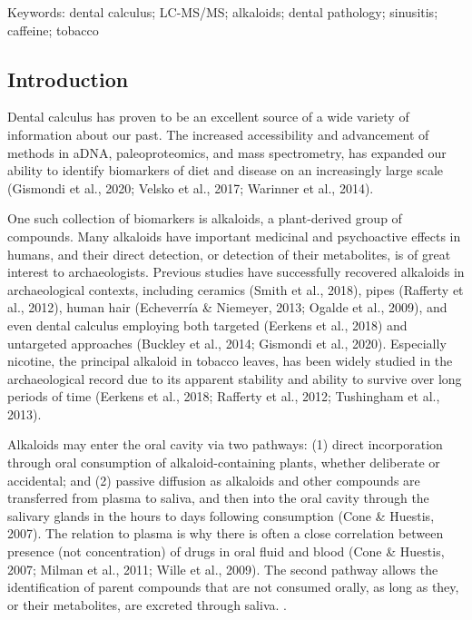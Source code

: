 \documentclass[
]{article}
\begin{document}
Keywords:  dental calculus; LC-MS/MS; alkaloids; dental pathology;
sinusitis; caffeine; tobacco 
\ifdefined\Shaded\renewenvironment{Shaded}{\begin{tcolorbox}[boxrule=0pt, borderline west={3pt}{0pt}{shadecolor}, sharp corners, frame hidden, enhanced, interior hidden, breakable]}{\end{tcolorbox}}\fi

\hypertarget{introduction}{%
\subsection{Introduction}\label{introduction}}

Dental calculus has proven to be an excellent source of a wide variety
of information about our past. The increased accessibility and
advancement of methods in aDNA, paleoproteomics, and mass spectrometry,
has expanded our ability to identify biomarkers of diet and disease on
an increasingly large scale (Gismondi et al., 2020; Velsko et al., 2017;
Warinner et al., 2014).

One such collection of biomarkers is alkaloids, a plant-derived group of
compounds. Many alkaloids have important medicinal and psychoactive
effects in humans, and their direct detection, or detection of their
metabolites, is of great interest to archaeologists. Previous studies
have successfully recovered alkaloids in archaeological contexts,
including ceramics (Smith et al., 2018), pipes (Rafferty et al., 2012),
human hair (Echeverría \& Niemeyer, 2013; Ogalde et al., 2009), and even
dental calculus employing both targeted (Eerkens et al., 2018) and
untargeted approaches (Buckley et al., 2014; Gismondi et al., 2020).
Especially nicotine, the principal alkaloid in tobacco leaves, has been
widely studied in the archaeological record due to its apparent
stability and ability to survive over long periods of time (Eerkens et
al., 2018; Rafferty et al., 2012; Tushingham et al., 2013).

Alkaloids may enter the oral cavity via two pathways: (1) direct
incorporation through oral consumption of alkaloid-containing plants,
whether deliberate or accidental; and (2) passive diffusion as alkaloids
and other compounds are transferred from plasma to saliva, and then into
the oral cavity through the salivary glands in the hours to days
following consumption (Cone \& Huestis, 2007). The relation to plasma is
why there is often a close correlation between presence (not
concentration) of drugs in oral fluid and blood (Cone \& Huestis, 2007;
Milman et al., 2011; Wille et al., 2009). The second pathway allows the
identification of parent compounds that are not consumed orally, as long
as they, or their metabolites, are excreted through saliva. .
\end{document}
